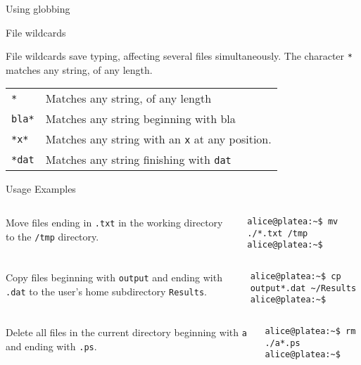 \begin{frame}[t,fragile]{Using \alert{globbing}}

  \vspace{-0.3cm}
  \begin{block}{File wildcards}
    {\footnotesize
File wildcards save typing, affecting several files simultaneously. The character \alert{\texttt{*}} matches any string, of any length.

\begin{tabular}{|l|l|}
\hline
\texttt{*} & Matches any string, of any length \\
\texttt{bla*} & Matches any string beginning with bla \\
\texttt{*x*} & Matches any string with an \texttt{x} at any position. \\
\texttt{*dat} & Matches any string finishing with \texttt{dat} \\
\hline
\end{tabular}

  Usage Examples
}


\vspace{-0.3cm}
{\scriptsize

  \begin{columns}
       Move files ending in \texttt{.txt} in the working directory to the \texttt{/tmp} directory.
        \begin{lstlisting}
alice@platea:~$ mv ./*.txt /tmp
alice@platea:~$ 
        \end{lstlisting}
    \end{columns}
  \begin{columns}
         Copy files beginning with \texttt{output} and ending with \texttt{.dat} to the user's home subdirectory \texttt{Results}.
        \begin{lstlisting}
alice@platea:~$ cp output*.dat ~/Results
alice@platea:~$
        \end{lstlisting}
    \end{columns}
  \begin{columns}
        Delete all files in the current directory beginning with \texttt{a} and ending with \texttt{.ps}.
        \begin{lstlisting}
alice@platea:~$ rm ./a*.ps
alice@platea:~$
        \end{lstlisting}
    \end{columns}
  }
  \end{block}
  
\end{frame}
